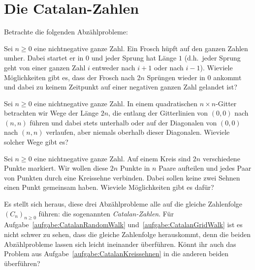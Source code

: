 \section{Die Catalan-Zahlen}\label{kapitel:Catalan}
Betrachte die folgenden Abzählprobleme:

\begin{aufgabe*}\label{aufgabe:CatalanRandomWalk}
	Sei $n\geqslant 0$ eine nichtnegative ganze Zahl. Ein Frosch hüpft auf den ganzen Zahlen umher. Dabei startet er in $0$ und jeder Sprung hat Länge $1$ (d.h.\ jeder Sprung geht von einer ganzen Zahl $i$ entweder nach $i+1$ oder nach $i-1$). Wieviele Möglichkeiten gibt es, dass der Frosch nach $2n$ Sprüngen wieder in $0$ ankommt und dabei zu keinem Zeitpunkt auf einer negativen ganzen Zahl gelandet ist?
\end{aufgabe*}
\begin{aufgabe*}\label{aufgabe:CatalanGridWalk}
	Sei $n\geqslant 0$ eine nichtnegative ganze Zahl. In einem quadratischen $n\times n$-Gitter betrachten wir Wege der Länge $2n$, die entlang der Gitterlinien von $(0,0)$ nach $(n,n)$ führen und dabei stets unterhalb oder auf der Diagonalen von $(0,0)$ nach $(n,n)$ verlaufen, aber niemals oberhalb dieser Diagonalen. Wieviele solcher Wege gibt es?
\end{aufgabe*}
\begin{aufgabe*}\label{aufgabe:CatalanKreissehnen}
	Sei $n\geqslant 0$ eine nichtnegative ganze Zahl. Auf einem Kreis sind $2n$ verschiedene Punkte markiert. Wir wollen diese $2n$ Punkte in $n$ Paare aufteilen und jedes Paar von Punkten durch eine Kreissehne verbinden. Dabei sollen keine zwei Sehnen einen Punkt gemeinsam haben. Wieviele Möglichkeiten gibt es dafür?
\end{aufgabe*}

Es stellt sich heraus, diese drei Abzählprobleme alle auf die gleiche Zahlenfolge $(C_n)_{n\geqslant 0}$ führen: die sogenannten \emph{Catalan-Zahlen}. Für Aufgabe~\ref{aufgabe:CatalanRandomWalk} und~\ref{aufgabe:CatalanGridWalk} ist es nicht schwer zu sehen, dass die gleiche Zahlenfolge herauskommt, denn die beiden Abzählprobleme lassen sich leicht ineinander überführen. Könnt ihr auch das Problem aus Aufgabe~\ref{aufgabe:CatalanKreissehnen} in die anderen beiden überführen?

